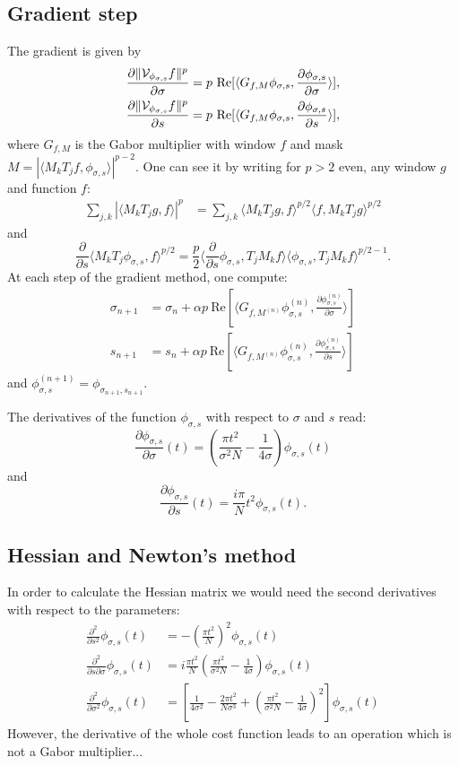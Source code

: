 \documentclass[11pt]{article}
\begin{document}
\subsection{Gradient step}
The gradient is given by
\begin{align}
\frac{\partial \|{\cal V}_{\phi_{\sigma,s}}f\|^p}{\partial \sigma}=p\ \text{Re}[\langle G_{f,M}\phi_{\sigma,s},\frac{\partial \phi_{\sigma,s}}{\partial \sigma}\rangle],\\
\frac{\partial \|{\cal V}_{\phi_{\sigma,s}}f\|^p}{\partial s}=p\ \text{Re}[\langle G_{f,M}\phi_{\sigma,s},\frac{\partial \phi_{\sigma,s}}{\partial s}\rangle],
\end{align}
where $G_{f,M}$ is the Gabor multiplier with window $f$ and mask $M=|\langle M_kT_jf , \phi_{\sigma,s}\rangle |^{p-2}$. One can see it by writing for $p>2$ even, any window $g$ and function $f$:
\begin{align*}
\sum_{j,k}|\langle M_kT_jg , f\rangle |^p&=\sum_{j,k}\langle M_kT_jg , f\rangle^{p/2} \langle f,M_kT_jg \rangle^{p/2}
\end{align*}
and 
$$\frac{\partial}{\partial s}\langle M_kT_j\phi_{\sigma,s} , f\rangle^{p/2}=\frac{p}{2}\langle \frac{\partial}{\partial s}\phi_{\sigma,s} , T_jM_kf\rangle \langle \phi_{\sigma,s} , T_jM_kf\rangle^{p/2-1}.
$$
At each step of the gradient method, one compute:
\begin{align}
\sigma_{n+1}&=\sigma_n+\alpha p\ \text{Re}[\langle G_{f,M^{(n)}}\phi_{\sigma,s}^{(n)},\frac{\partial \phi_{\sigma,s}^{(n)}}{\partial \sigma}\rangle]\\
s_{n+1}&=s_n+\alpha p\ \text{Re}[\langle G_{f,M^{(n)}}\phi_{\sigma,s}^{(n)},\frac{\partial \phi_{\sigma,s}^{(n)}}{\partial s}\rangle]
\end{align}
and $\phi_{\sigma,s}^{(n+1)}=\phi_{\sigma_{n+1},s_{n+1}}$.

The derivatives of the function $\phi_{\sigma,s}$ with respect to $\sigma$ and $s$ read:
$$\frac{\partial \phi_{\sigma,s}}{\partial \sigma}(t)= \left(\frac{\pi t^2}{\sigma^2 N}-\frac{1}{4\sigma}\right)\phi_{\sigma,s}(t)
$$
and
$$\frac{\partial \phi_{\sigma,s}}{\partial s}(t)=  \frac{i\pi}{N} t^2 \phi_{\sigma,s}(t).
$$

\subsection{Hessian and Newton's method}
In order to calculate the Hessian matrix we would need the second derivatives with respect to the parameters:
\begin{align}
\frac{\partial^2}{\partial s^2}\phi_{\sigma,s}(t)&=-\left(\frac{\pi t^2}{N}\right)^2\phi_{\sigma,s}(t)\\
\frac{\partial^2}{\partial s\partial\sigma}\phi_{\sigma,s}(t)&=i\frac{\pi t^2}{N}\left(\frac{\pi t^2}{\sigma^2 N}-\frac{1}{4\sigma}\right)\phi_{\sigma,s}(t)\\
\frac{\partial^2}{\partial \sigma^2}\phi_{\sigma,s}(t)&=\left[\frac{1}{4\sigma^2}-\frac{2\pi t^2}{N\sigma^3}+\left(\frac{\pi t^2}{\sigma^2 N}-\frac{1}{4\sigma}\right)^2\right]\phi_{\sigma,s}(t)
\end{align}
{\color{red} However, the derivative of the whole cost function leads to an operation which is not a Gabor multiplier...}
\end{document}
